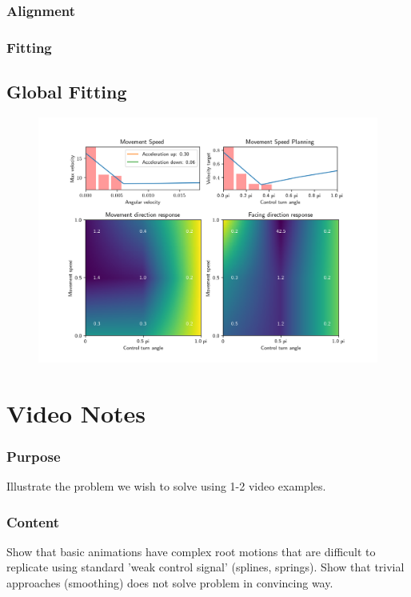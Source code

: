 \subsubsection{Alignment}
\subsubsection{Fitting}

\subsection{Global Fitting}

\begin{figure}
    \centering
    \includegraphics[width=1.0\columnwidth]{img/locomotion mode.png}
    \caption{}
    \label{fig:results:locomotion_mode}
\end{figure}



\section{Video Notes}

\subsubsection{Purpose}
Illustrate the problem we wish to solve using 1-2 video examples.
\subsubsection{Content}
Show that basic animations have complex root motions that are difficult to replicate using standard 'weak control signal' (splines, springs). 
Show that trivial approaches (smoothing) does not solve problem in convincing way.
